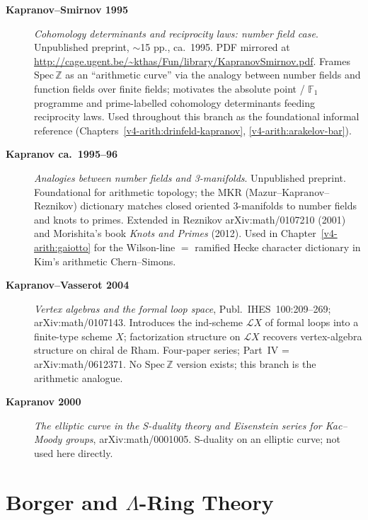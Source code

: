 \begin{description}
\item[\textbf{Kapranov--Smirnov 1995}] \emph{Cohomology determinants
and reciprocity laws: number field case}. Unpublished preprint,
\(\sim\)15 pp., ca.~1995. PDF mirrored at
\url{http://cage.ugent.be/~kthas/Fun/library/KapranovSmirnov.pdf}.
Frames \(\mathrm{Spec}\,\mathbb{Z}\) as an ``arithmetic curve'' via
the analogy between number fields and function fields over finite
fields; motivates the absolute point / \(\mathbb{F}_{1}\) programme
and prime-labelled cohomology determinants feeding reciprocity laws.
Used throughout this branch as the foundational informal reference
(Chapters~\ref{v4-arith:drinfeld-kapranov}, \ref{v4-arith:arakelov-bar}).
\item[\textbf{Kapranov ca.~1995--96}] \emph{Analogies between number
fields and 3-manifolds}. Unpublished preprint. Foundational for
arithmetic topology; the MKR (Mazur--Kapranov--Reznikov) dictionary
matches closed oriented 3-manifolds to number fields and knots to
primes. Extended in Reznikov arXiv:math/0107210 (2001) and
Morishita's book \emph{Knots and Primes} (2012). Used in
Chapter~\ref{v4-arith:gaiotto} for the Wilson-line \(=\) ramified
Hecke character dictionary in Kim's arithmetic Chern--Simons.
\item[\textbf{Kapranov--Vasserot 2004}] \emph{Vertex algebras and
the formal loop space}, Publ.~IHES~100:209--269;
arXiv:math/0107143. Introduces the ind-scheme \(\mathcal{L}X\) of
formal loops into a finite-type scheme \(X\); factorization structure
on \(\mathcal{L}X\) recovers vertex-algebra structure on chiral de
Rham. Four-paper series; Part~IV = arXiv:math/0612371. No
\(\mathrm{Spec}\,\mathbb{Z}\) version exists; this branch is the
arithmetic analogue.
\item[\textbf{Kapranov 2000}] \emph{The elliptic curve in the
S-duality theory and Eisenstein series for Kac--Moody groups},
arXiv:math/0001005. S-duality on an elliptic curve; not used here
directly.
\end{description}

\section{Borger and \(\Lambda\)-Ring Theory}
\label{v4-arith:app:A:borger}


